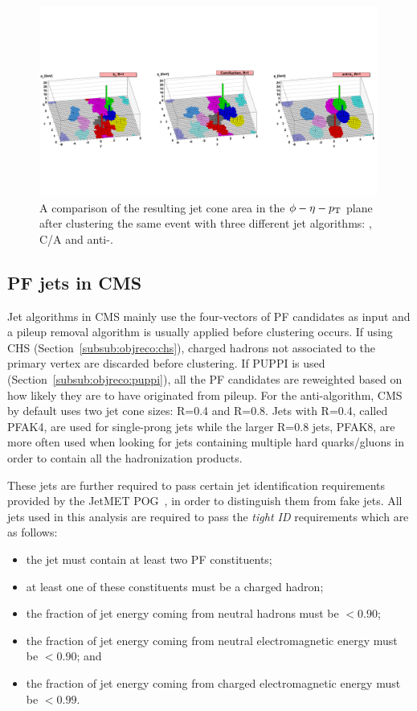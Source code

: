 \begin{figure}[h] 
    \centering
    \includegraphics[width=0.99\textwidth]{figures/event_reconstruction/clustering_algos.pdf}
    \caption{A comparison of the resulting jet cone area in the $\phi-\eta-p_{\mathrm{T}}$ plane after clustering the same event with three different jet algorithms: \kt, C/A and anti-\kt. ~\cite{Cacciari:2008gp}}
    \label{fig:objreco:jetalgo_comp}
\end{figure}

\subsection{PF jets in CMS}
Jet algorithms in CMS mainly use the four-vectors of PF candidates as input and a pileup removal algorithm is usually applied before clustering occurs. If using CHS (Section~\ref{subsub:objreco:chs}), charged hadrons not associated to the primary vertex are discarded before clustering. If PUPPI is used (Section~\ref{subsub:objreco:puppi}), all the PF candidates are reweighted based on how likely they are to have originated from pileup. 
For the anti-\kt algorithm, CMS by default uses two jet cone sizes: R=0.4 and R=0.8. Jets with R=0.4, called PFAK4, are used for single-prong jets while the larger R=0.8 jets, PFAK8, are more often used when looking for jets containing multiple hard quarks/gluons in order to contain all the hadronization products.\par
 These jets are further required to pass certain jet identification requirements provided by the JetMET POG~\cite{jetID_JME}, in order to distinguish them from fake jets. All jets used in this analysis are required to pass the \textit{tight ID} requirements which are as follows:
\begin{itemize}
  \itemsep0em 
\item the jet must contain at least two PF constituents;
\item at least one of these constituents must be a charged hadron;
\item the fraction of jet energy coming from neutral hadrons must be $< 0.90$;
\item the fraction of jet energy coming from neutral electromagnetic energy must be $< 0.90$; and
\item the fraction of jet energy coming from charged electromagnetic energy must be $< 0.99$.
\end{itemize} 

